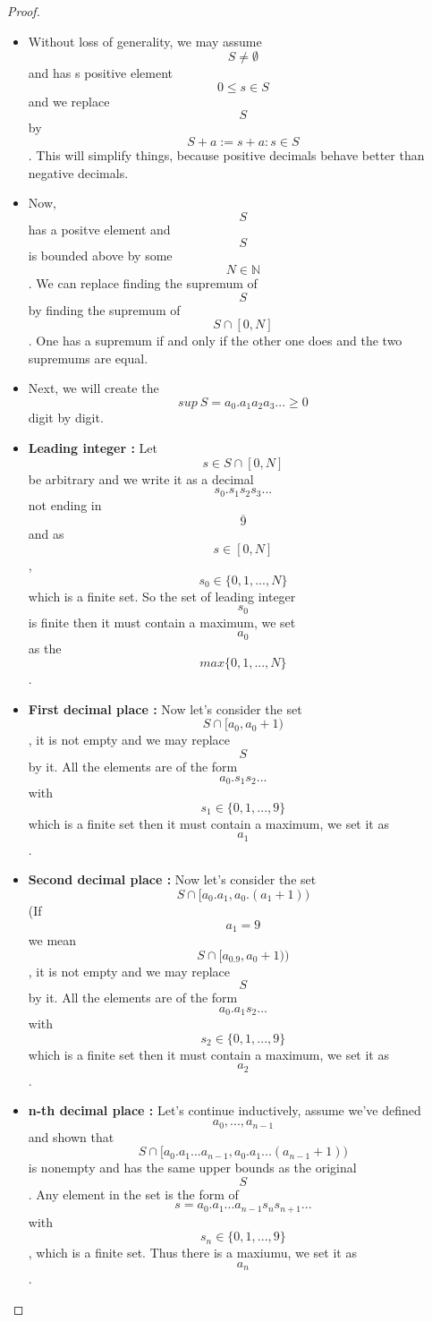 \documentclass[a4paper]{article}
\def\nn{{\mathbb N}}
\begin{document}
\begin{proof}
    \begin{itemize}
        \item Without loss of generality, we may assume $$S\neq \emptyset$$ and has s positive element $$0\leq s \in S$$ and we replace $$S$$ by $$S+a:={s+a: s\in S}$$. This will simplify things, because positive decimals behave better than negative decimals.
        \item Now, $$S$$ has a positve element and $$S$$ is bounded above by some $$N \in \nn$$. We can replace finding the supremum of $$S$$ by finding the supremum of $$S\cap[0,N]$$. One has a supremum if and only if the other one does and the two supremums are equal.
        \item Next, we will create the $$sup \:S=a_0.a_1a_2a_3...\geq 0$$ digit by digit.
        \item \textsf{\textbf{Leading integer :}} Let $$s\in S\cap [0,N]$$ be arbitrary and we write it as a decimal $$s_0.s_1s_2s_3...$$ not ending in $$\overline{9}$$ and as $$s\in [0,N]$$, $$s_0\in \{0,1,...,N\}$$ which is a finite set. So the set of leading integer $$s_0$$ is finite then it must contain a maximum, we set $$a_0$$ as the $$max\{0,1,...,N\}$$.
        \item \textsf{\textbf{First decimal place :}} Now let's consider the set $$S\cap [a_0,a_0+1)$$, it is not empty and we may replace $$S$$ by it. All the elements are of the form $$a_0.s_1s_2...$$ with $$s_1\in \{0,1,...,9\}$$ which is a finite set then it must contain a maximum, we set it as $$a_1$$.
        \item \textsf{\textbf{Second decimal place :}} Now let's consider the set $$S\cap [a_0.a_1,a_0.(a_1+1))$$(If $$a_1=9$$ we mean $$S\cap[a_0.9,a_0+1))$$, it is not empty and we may replace $$S$$ by it. All the elements are of the form $$a_0.a_1s_2...$$ with $$s_2\in \{0,1,...,9\}$$ which is a finite set then it must contain a maximum, we set it as $$a_2$$. 
        \item \textsf{\textbf{n-th decimal place :}} Let's continue inductively, assume we've defined $$a_0,...,a_{n-1}$$ and shown that
            \begin{equation*}
                S\cap [a_0.a_1...a_{n-1},a_0.a_1...(a_{n-1}+1))
            \end{equation*}
        is nonempty and has the same upper bounds as the original $$S$$. Any element in the set is the form of $$s=a_0.a_1...a_{n-1}s_ns_{n+1}...$$ with $$s_n\in\{0,1,...,9\}$$, which is a finite set. Thus there is a maxiumu, we set it as $$a_n$$.

\end{itemize}
\end{proof}
\end{document}
